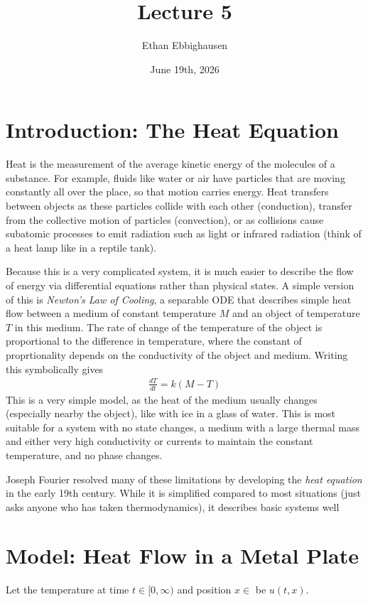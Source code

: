 \documentclass{article}
\title{Lecture 5}
\author{Ethan Ebbighausen}
\date{June 19th, 2026}
\begin{document}
	\pagestyle{fancy}
	\fancyfoot{} 
	
	\maketitle
	
	\section{Introduction: The Heat Equation}
	
	Heat is the measurement of the average kinetic energy of the molecules of a substance. For example, fluids like water or air have particles that are moving constantly all over the place, so that motion carries energy. Heat transfers between objects as these particles collide with each other (conduction), transfer from the collective motion of particles (convection), or as collisions cause subatomic processes to emit radiation such as light or infrared radiation (think of a heat lamp like in a reptile tank). 
	
	Because this is a very complicated system, it is much easier to describe the flow of energy via differential equations rather than physical states. A simple version of this is \textit{Newton's Law of Cooling}, a separable ODE that describes simple heat flow between a medium of constant temperature $M$ and an object of temperature $T$ in this medium. The rate of change of the temperature of the object is proportional to the difference in temperature, where the constant of proprtionality depends on the conductivity of the object and medium. Writing this symbolically gives
	\begin{align*}
		\frac{dT}{dt} = k(M-T)
	\end{align*}
	This is a very simple model, as the heat of the medium usually changes (especially nearby the object), like with ice in a glass of water. This is most suitable for a system with no state changes, a medium with a large thermal mass and either very high conductivity or currents to maintain the constant temperature, and no phase changes. 
	
	Joseph Fourier resolved many of these limitations by developing the \textit{heat equation} in the early 19th century. While it is simplified compared to most situations (just asks anyone who has taken thermodynamics), it describes basic systems well 
	
	\section{Model: Heat Flow in a Metal Plate}
	Let the temperature at time $t \in [0,\infty)$ and position $x \in $ be $u(t,x)$.
	
\end{document}
